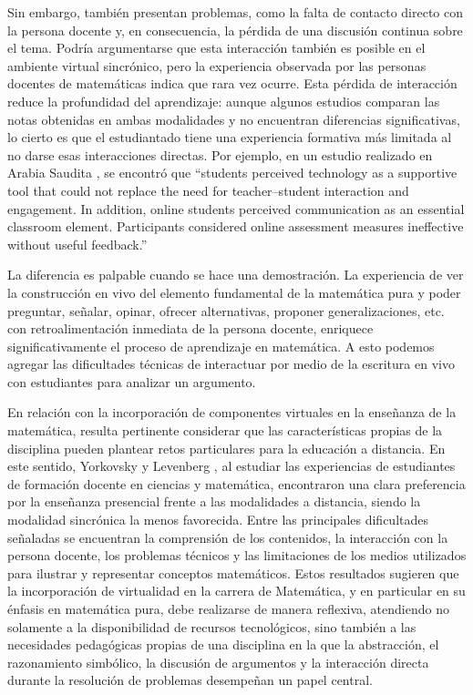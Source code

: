 Sin embargo, también presentan problemas, como la falta de contacto directo con la persona docente y, en consecuencia, la pérdida de una discusión continua sobre el tema. Podría argumentarse que esta interacción también es posible en el ambiente virtual sincrónico, pero la experiencia observada por las personas docentes de matemáticas indica que rara vez ocurre. Esta pérdida de interacción reduce la profundidad del aprendizaje: aunque algunos estudios comparan las notas obtenidas en ambas modalidades y no encuentran diferencias significativas, lo cierto es que el estudiantado tiene una experiencia formativa más limitada al no darse esas interacciones directas. Por ejemplo, en un estudio realizado en Arabia Saudita \cite{Alshehri31122023}, se encontró que “students perceived technology as a supportive tool that could not replace the need for teacher–student interaction and engagement. In addition, online students perceived communication as an essential classroom element. Participants considered online assessment measures ineffective without useful feedback.”

La diferencia es palpable cuando se hace una demostración. La experiencia de ver la construcción en vivo del elemento fundamental de la matemática pura y poder preguntar, señalar, opinar, ofrecer alternativas, proponer generalizaciones, etc. con retroalimentación inmediata de la persona docente, enriquece significativamente el proceso de aprendizaje en matemática. A esto podemos agregar las dificultades técnicas de interactuar por medio de la escritura en vivo con estudiantes para analizar un argumento.

En relación con la incorporación de componentes virtuales en la enseñanza de la matemática, resulta pertinente considerar que las características propias de la disciplina pueden plantear retos particulares para la educación a distancia. En este sentido, Yorkovsky y Levenberg \parencite{YorkovskyLevenberg2022}, al estudiar las experiencias de estudiantes de formación docente en ciencias y matemática, encontraron una clara preferencia por la enseñanza presencial frente a las modalidades a distancia, siendo la modalidad sincrónica la menos favorecida. Entre las principales dificultades señaladas se encuentran la comprensión de los contenidos, la interacción con la persona docente, los problemas técnicos y las limitaciones de los medios utilizados para ilustrar y representar conceptos matemáticos. Estos resultados sugieren que la incorporación de virtualidad en la carrera de Matemática, y en particular en su énfasis en matemática pura, debe realizarse de manera reflexiva, atendiendo no solamente a la disponibilidad de recursos tecnológicos, sino también a las necesidades pedagógicas propias de una disciplina en la que la abstracción, el razonamiento simbólico, la discusión de argumentos y la interacción directa durante la resolución de problemas desempeñan un papel central.

